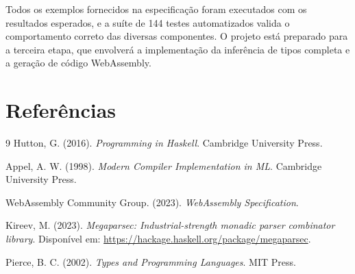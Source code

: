 \documentclass[12pt,a4paper]{article}
\begin{document}
Todos os exemplos fornecidos na especificação foram executados com os resultados esperados, e a suíte de 144 testes automatizados valida o comportamento correto das diversas componentes. O projeto está preparado para a terceira etapa, que envolverá a implementação da inferência de tipos completa e a geração de código WebAssembly.

\section{Referências}

\begin{thebibliography}{9}
Hutton, G. (2016). \emph{Programming in Haskell}. Cambridge University Press.

Appel, A. W. (1998). \emph{Modern Compiler Implementation in ML}. Cambridge University Press.

WebAssembly Community Group. (2023). \emph{WebAssembly Specification}.

Kireev, M. (2023). \emph{Megaparsec: Industrial-strength monadic parser combinator library}. Disponível em: \url{https://hackage.haskell.org/package/megaparsec}.

Pierce, B. C. (2002). \emph{Types and Programming Languages}. MIT Press.
\end{thebibliography}
\end{document}

